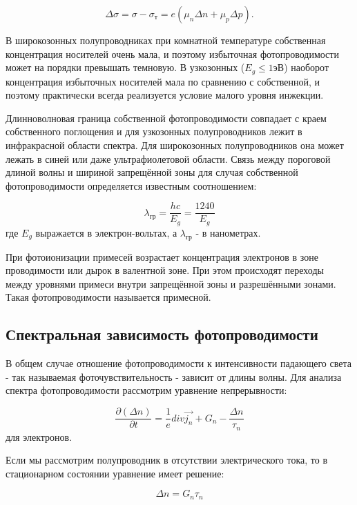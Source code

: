 \begin{equation}
\Delta \sigma = \sigma - \sigma_{\text{т}} = e (\mu_{n} \Delta n + \mu_{p} \Delta p).
\end{equation}

В широкозонных полупроводниках при комнатной температуре собственная концентрация носителей очень мала, и поэтому избыточная фотопроводимости может на порядки превышать темновую. В узкозонных ($E_{g} \le 1 \text{эВ}$) наоборот концентрация избыточных носителей мала по сравнению с собственной, и поэтому практически всегда реализуется условие малого уровня инжекции.

Длинноволновая граница собственной фотопроводимости совпадает с краем собственного поглощения и для узкозонных полупроводников лежит в инфракрасной области спектра. Для широкозонных полупроводников она может лежать в синей или даже ультрафиолетовой области. Связь между пороговой длиной волны и шириной запрещённой зоны для случая собственной фотопроводимости определяется известным соотношением:

\begin{equation}
\lambda_{\text{гр}} = \frac{h c}{E_{g}} = \frac{1240}{E_{g}}
\end{equation}
где $E_{g}$ выражается в электрон-вольтах, а $\lambda_{\text{гр}}$ - в нанометрах.

При фотоионизации примесей возрастает концентрация электронов в зоне проводимости или дырок в валентной зоне. При этом происходят переходы между уровнями примеси внутри запрещённой зоны и разрешёнными зонами. Такая фотопроводимости называется примесной.

\subsection{Спектральная зависимость фотопроводимости}
В общем случае отношение фотопроводимости к интенсивности падающего света - так называемая фоточувствительность - зависит от длины волны. Для анализа спектра фотопроводимости рассмотрим уравнение непрерывности:

\begin{equation}
\frac{\partial (\Delta n)}{\partial t} = \frac{1}{e} div \overrightarrow{j_{n}} + G_{n} - \frac{\Delta n}{\tau_{n}}
\end{equation}
для электронов.

Если мы рассмотрим полупроводник в отсутствии электрического тока, то в стационарном состоянии уравнение имеет решение:

\begin{equation}
\Delta n = G_{n} \tau_{n}
\end{equation}


